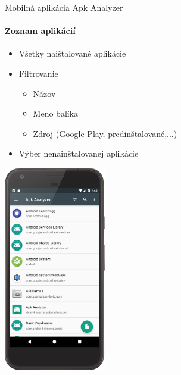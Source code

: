 \documentclass{beamer}
\begin{document}
  \begin{frame}[label=lists]{Mobilná aplikácia Apk Analyzer}
 	 \framesubtitle{Zoznam aplikácií}
	\begin{minipage}[htb]{\textwidth}
		\begin{minipage}[t]{0.5\textwidth}
			\hbox{}
			\hbox{}
			\hbox{}
			\begin{itemize}
				\item Všetky naištalované aplikácie
				\item Filtrovanie
					\begin{itemize}
						\item Názov
						\item Meno balíka
						\item Zdroj (Google Play, predinštalované,...)
					\end{itemize}
				\item Výber nenainštalovanej aplikácie
			\end{itemize}
     		\vfill
		\end{minipage}%
	\hfill
	\centering
		\begin{minipage}[t][][b]{0.4\textwidth}
		\centering
		\includegraphics[height=9cm]{images/app/list_device.png}
		\label{fig:app-list}
		\end{minipage}%
	\end{minipage}
  \end{frame}   
  
\end{document}

